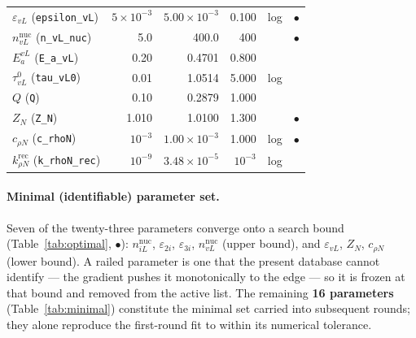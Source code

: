 \documentclass{article}
\begin{document}
\begin{table}[h!]
\begin{tabular}{l r r r c c}
$\varepsilon_{vL}$ (\texttt{epsilon\_vL})      & $5\times10^{-3}$ & $5.00\times10^{-3}$ & 0.100 & log & $\bullet$\\
$n_{vL}^{\mathrm{nuc}}$ (\texttt{n\_vL\_nuc})  & 5.0 & 400.0 & 400 & & $\bullet$\\
$E^{vL}_a$ (\texttt{E\_a\_vL})                 & 0.20 & 0.4701 & 0.800 & & \\
$\tau^0_{vL}$ (\texttt{tau\_vL0})              & 0.01 & 1.0514 & 5.000 & log & \\
$Q$ (\texttt{Q})                               & 0.10 & 0.2879 & 1.000 & & \\
$Z_N$ (\texttt{Z\_N})                          & 1.010 & 1.0100 & 1.300 & & $\bullet$\\
$c_{\rho N}$ (\texttt{c\_rhoN})                & $10^{-3}$ & $1.00\times10^{-3}$ & 1.000 & log & $\bullet$\\
$k^{\mathrm{rec}}_{\rho N}$ (\texttt{k\_rhoN\_rec}) & $10^{-9}$ & $3.48\times10^{-5}$ & $10^{-3}$ & log & \\
\hline
\end{tabular}
\end{table}

\paragraph{Minimal (identifiable) parameter set.}
Seven of the twenty-three parameters converge onto a search bound
(Table~\ref{tab:optimal}, $\bullet$): $n_{iL}^{\mathrm{nuc}}$,
$\varepsilon_{2i}$, $\varepsilon_{3i}$, $n_{vL}^{\mathrm{nuc}}$ (upper bound),
and $\varepsilon_{vL}$, $Z_N$, $c_{\rho N}$ (lower bound). A railed parameter is
one that the present database cannot identify — the gradient pushes it monotonically
to the edge — so it is frozen at that bound and removed from the active list.
The remaining \textbf{16 parameters} (Table~\ref{tab:minimal}) constitute the
minimal set carried into subsequent rounds; they alone reproduce the first-round
fit to within its numerical tolerance.
\end{document}
